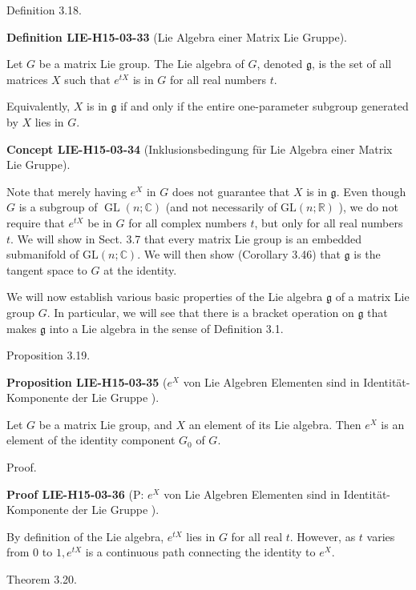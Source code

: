 \documentclass[10pt, letterpaper]{article}
\newcommand{\CustomHeading}[3]{%
  \par\medskip\noindent%
  \textbf{#1 #2} \textnormal{(#3)}.\enskip%
}
\newenvironment{DEF}[2]{\begin{unitbox}\CustomHeading{Definition}{#1}{#2}}{\end{unitbox}}
\newenvironment{PROP}[2]{\begin{unitbox}\CustomHeading{Proposition}{#1}{#2}}{\end{unitbox}}
\newenvironment{CONC}[2]{\begin{unitbox}\CustomHeading{Concept}{#1}{#2}}{\end{unitbox}}
\newenvironment{PROOF}[2]{\begin{unitbox}\CustomHeading{Proof}{#1}{#2}}{\end{unitbox}}
\begin{document}
Definition 3.18. 


\begin{DEF}{LIE-H15-03-33}{Lie Algebra einer Matrix Lie Gruppe}
Let $G$ be a matrix Lie group. The Lie algebra of $G$, denoted $\mathfrak{g}$, is the set of all matrices $X$ such that $e^{t X}$ is in $G$ for all real numbers $t$.

Equivalently, $X$ is in $\mathfrak{g}$ if and only if the entire one-parameter subgroup generated by $X$ lies in $G$.
\end{DEF}


\begin{CONC}{LIE-H15-03-34}{Inklusionsbedingung für Lie Algebra einer Matrix Lie Gruppe}
Note that merely having $e^{X}$ in $G$ does not guarantee that $X$ is in $\mathfrak{g}$. Even though $G$ is a subgroup of $\operatorname{GL}(n ; \mathbb{C})$ (and not necessarily of $\mathrm{GL}(n ; \mathbb{R})$ ), we do not require that $e^{t X}$ be in $G$ for all complex numbers $t$, but only for all real numbers $t$. We will show in Sect. 3.7 that every matrix Lie group is an embedded submanifold of $\mathrm{GL}(n ; \mathbb{C})$. We will then show (Corollary 3.46) that $\mathfrak{g}$ is the tangent space to $G$ at the identity.
\end{CONC}

We will now establish various basic properties of the Lie algebra $\mathfrak{g}$ of a matrix Lie group $G$. In particular, we will see that there is a bracket operation on $\mathfrak{g}$ that makes $\mathfrak{g}$ into a Lie algebra in the sense of Definition 3.1.

Proposition 3.19. 


\begin{PROP}{LIE-H15-03-35}{$e^X$ von Lie Algebren Elementen sind in Identität-Komponente der Lie Gruppe }
Let $G$ be a matrix Lie group, and $X$ an element of its Lie algebra. Then $e^{X}$ is an element of the identity component $G_{0}$ of $G$.
\end{PROP}

Proof. 

\begin{PROOF}{LIE-H15-03-36}{P: $e^X$ von Lie Algebren Elementen sind in Identität-Komponente der Lie Gruppe }
By definition of the Lie algebra, $e^{t X}$ lies in $G$ for all real $t$. However, as $t$ varies from 0 to $1, e^{t X}$ is a continuous path connecting the identity to $e^{X}$.
\end{PROOF}

Theorem 3.20. 
\end{document}
